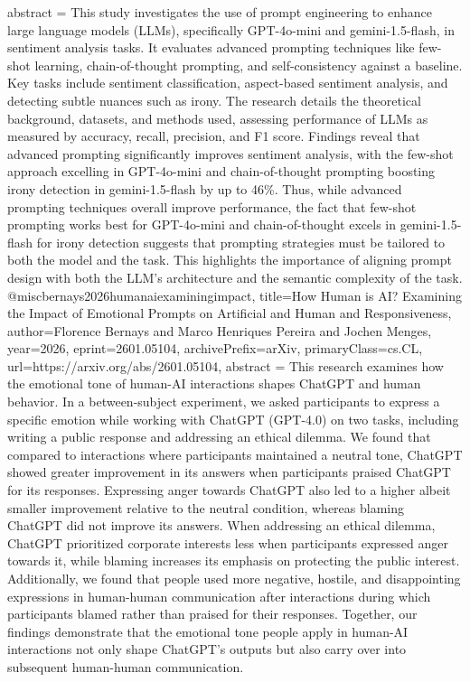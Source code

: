 {      abstract = {This study investigates the use of prompt engineering to enhance large language models (LLMs), specifically GPT-4o-mini and gemini-1.5-flash, in sentiment analysis tasks. It evaluates advanced prompting techniques like few-shot learning, chain-of-thought prompting, and self-consistency against a baseline. Key tasks include sentiment classification, aspect-based sentiment analysis, and detecting subtle nuances such as irony. The research details the theoretical background, datasets, and methods used, assessing performance of LLMs as measured by accuracy, recall, precision, and F1 score. Findings reveal that advanced prompting significantly improves sentiment analysis, with the few-shot approach excelling in GPT-4o-mini and chain-of-thought prompting boosting irony detection in gemini-1.5-flash by up to 46\%. Thus, while advanced prompting techniques overall improve performance, the fact that few-shot prompting works best for GPT-4o-mini and chain-of-thought excels in gemini-1.5-flash for irony detection suggests that prompting strategies must be tailored to both the model and the task. This highlights the importance of aligning prompt design with both the LLM's architecture and the semantic complexity of the task.}
}@misc{bernays2026humanaiexaminingimpact,
      title={How Human is AI? Examining the Impact of Emotional Prompts on Artificial and Human and Responsiveness}, 
      author={Florence Bernays and Marco Henriques Pereira and Jochen Menges},
      year={2026},
      eprint={2601.05104},
      archivePrefix={arXiv},
      primaryClass={cs.CL},
      url={https://arxiv.org/abs/2601.05104},
      abstract = {This research examines how the emotional tone of human-AI interactions shapes ChatGPT and human behavior. In a between-subject experiment, we asked participants to express a specific emotion while working with ChatGPT (GPT-4.0) on two tasks, including writing a public response and addressing an ethical dilemma. We found that compared to interactions where participants maintained a neutral tone, ChatGPT showed greater improvement in its answers when participants praised ChatGPT for its responses. Expressing anger towards ChatGPT also led to a higher albeit smaller improvement relative to the neutral condition, whereas blaming ChatGPT did not improve its answers. When addressing an ethical dilemma, ChatGPT prioritized corporate interests less when participants expressed anger towards it, while blaming increases its emphasis on protecting the public interest. Additionally, we found that people used more negative, hostile, and disappointing expressions in human-human communication after interactions during which participants blamed rather than praised for their responses. Together, our findings demonstrate that the emotional tone people apply in human-AI interactions not only shape ChatGPT's outputs but also carry over into subsequent human-human communication.}
}
